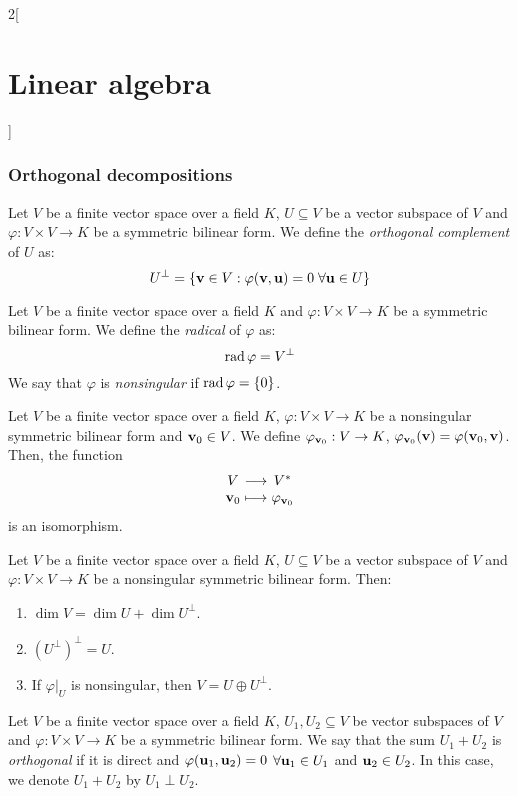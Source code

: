 \documentclass[../../../main_math.tex]{subfiles}
\begin{document}
\begin{multicols}{2}[\section{Linear algebra}]
  \subsubsection{Orthogonal decompositions}
  \begin{definition}\label{LA:singular}
    Let $V$ be a finite vector space over a field $K$, $U\subseteq V$ be a vector subspace of $V$ and $\varphi:V\times V\rightarrow K$ be a symmetric bilinear form. We define the \emph{orthogonal complement} of $U$ as: $$U^\perp=\{\boldsymbol{\mathrm{v}}\in V:\varphi(\boldsymbol{\mathrm{v}},\boldsymbol{\mathrm{u}})=0\;\forall\boldsymbol{\mathrm{u}}\in U\}$$
  \end{definition}
  \begin{definition}
    Let $V$ be a finite vector space over a field $K$ and $\varphi:V\times V\rightarrow K$ be a symmetric bilinear form. We define the \emph{radical} of $\varphi$ as: $$\operatorname{rad}\varphi=V^\perp$$ We say that $\varphi$ is \emph{nonsingular} if $\operatorname{rad}\varphi=\{0\}$.
  \end{definition}
  \begin{definition}
    Let $V$ be a finite vector space over a field $K$, $\varphi:V\times V\rightarrow K$ be a nonsingular symmetric bilinear form and $\boldsymbol{\mathrm{v}}_0\in V$. We define $\varphi_{\boldsymbol{\mathrm{v}}_0}:V\rightarrow K$, $\varphi_{\boldsymbol{\mathrm{v}}_0}(\boldsymbol{\mathrm{v}})=\varphi(\boldsymbol{\mathrm{v}}_0,\boldsymbol{\mathrm{v}})$. Then, the function
    $$\function{}{V}{V^*}{\vf{v}_0}{\varphi_{\vf{v}_0}}$$ is an isomorphism.
  \end{definition}
  \begin{definition}
    Let $V$ be a finite vector space over a field $K$, $U\subseteq V$ be a vector subspace of $V$ and $\varphi:V\times V\rightarrow K$ be a nonsingular symmetric bilinear form. Then:
    \begin{enumerate}
      \item $\dim V=\dim U+\dim U^\perp$.
      \item ${(U^\perp)}^\perp=U$.
      \item If $\varphi|_U$ is nonsingular, then $V=U\oplus U^\perp$.
    \end{enumerate}
  \end{definition}
  \begin{definition}
    Let $V$ be a finite vector space over a field $K$, $U_1,U_2\subseteq V$ be vector subspaces of $V$ and $\varphi:V\times V\rightarrow K$ be a symmetric bilinear form. We say that the sum $U_1+U_2$ is \emph{orthogonal} if it is direct and $\varphi(\boldsymbol{\mathrm{u}}_1,\boldsymbol{\mathrm{u}}_2)=0$ $\forall \boldsymbol{\mathrm{u}}_1\in U_1$ and $\boldsymbol{\mathrm{u}}_2\in U_2$. In this case, we denote $U_1+U_2$ by $U_1\perp U_2$.

\end{definition}
\end{multicols}
\end{document}
